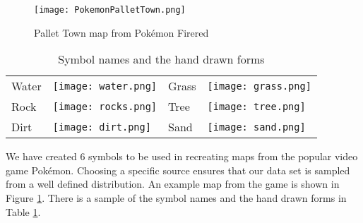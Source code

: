 \begin{figure}[h]
\begin{center}
\texttt{[image: PokemonPalletTown.png]}
\end{center}
\caption{Pallet Town map from Pok\'{e}mon Firered \cite{firered}} 
\label{fig:pokemon}
\end{figure}

\begin{table}
\label{table:symbols}
\caption{Symbol names and the hand drawn forms}
\begin{center}
\begin{tabular}{llll}
Water & \texttt{[image: water.png]} &
Grass & \texttt{[image: grass.png]} \\
Rock & \texttt{[image: rocks.png]} &
Tree & \texttt{[image: tree.png]} \\
Dirt & \texttt{[image: dirt.png]} &
Sand & \texttt{[image: sand.png]} \\
\end{tabular}
\end{center}
\end{table}

We have created 6 symbols to be used in recreating maps from the popular video
game Pok\'{e}mon. Choosing a specific source ensures that our data set is
sampled from a well defined distribution.  An example map from the game is
shown in Figure \ref{fig:pokemon}. There is a sample of the symbol names and
the hand drawn forms in Table \ref{table:symbols}.


